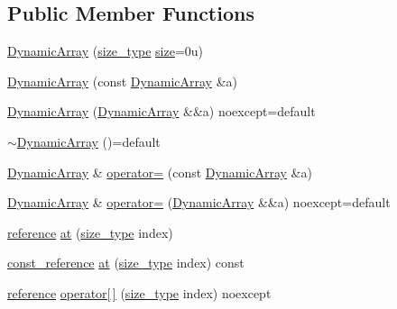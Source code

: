 \subsection*{Public Member Functions}
\begin{DoxyCompactItemize}
\item 
\mbox{\hyperlink{classmage_1_1_dynamic_array_a10ed30c171efe6a2370fe789c7dff97b}{Dynamic\+Array}} (\mbox{\hyperlink{classmage_1_1_dynamic_array_abae3236bcd8d1de414cbdf05219966b9}{size\+\_\+type}} \mbox{\hyperlink{classmage_1_1_dynamic_array_a18ac78a61310bc44493a15e69ca1f8f5}{size}}=0u)
\item 
\mbox{\hyperlink{classmage_1_1_dynamic_array_a784c1512831a391892fe096e28057d64}{Dynamic\+Array}} (const \mbox{\hyperlink{classmage_1_1_dynamic_array}{Dynamic\+Array}} \&a)
\item 
\mbox{\hyperlink{classmage_1_1_dynamic_array_acf1e5791e934e295cf8ef466ca5c35b9}{Dynamic\+Array}} (\mbox{\hyperlink{classmage_1_1_dynamic_array}{Dynamic\+Array}} \&\&a) noexcept=default
\item 
\mbox{\hyperlink{classmage_1_1_dynamic_array_a4bf332566b8b9236156c0f84ad764cff}{$\sim$\+Dynamic\+Array}} ()=default
\item 
\mbox{\hyperlink{classmage_1_1_dynamic_array}{Dynamic\+Array}} \& \mbox{\hyperlink{classmage_1_1_dynamic_array_aa1a53eca6856deb031805fe0e9632288}{operator=}} (const \mbox{\hyperlink{classmage_1_1_dynamic_array}{Dynamic\+Array}} \&a)
\item 
\mbox{\hyperlink{classmage_1_1_dynamic_array}{Dynamic\+Array}} \& \mbox{\hyperlink{classmage_1_1_dynamic_array_a63ad5a61d3efbb1c8dc505f18f01549d}{operator=}} (\mbox{\hyperlink{classmage_1_1_dynamic_array}{Dynamic\+Array}} \&\&a) noexcept=default
\item 
\mbox{\hyperlink{classmage_1_1_dynamic_array_ac725ab843a578b8eb2e4499eca728149}{reference}} \mbox{\hyperlink{classmage_1_1_dynamic_array_a29454a0acae17e4d194f9b6018800212}{at}} (\mbox{\hyperlink{classmage_1_1_dynamic_array_abae3236bcd8d1de414cbdf05219966b9}{size\+\_\+type}} index)
\item 
\mbox{\hyperlink{classmage_1_1_dynamic_array_ad2c044077223c0463e317649d4513dbc}{const\+\_\+reference}} \mbox{\hyperlink{classmage_1_1_dynamic_array_a236c420428994fbc7c92a74ef5db533e}{at}} (\mbox{\hyperlink{classmage_1_1_dynamic_array_abae3236bcd8d1de414cbdf05219966b9}{size\+\_\+type}} index) const
\item 
\mbox{\hyperlink{classmage_1_1_dynamic_array_ac725ab843a578b8eb2e4499eca728149}{reference}} \mbox{\hyperlink{classmage_1_1_dynamic_array_aad63a2cdeac991bbd474966f74b2eb78}{operator\mbox{[}$\,$\mbox{]}}} (\mbox{\hyperlink{classmage_1_1_dynamic_array_abae3236bcd8d1de414cbdf05219966b9}{size\+\_\+type}} index) noexcept

\end{DoxyCompactItemize}
